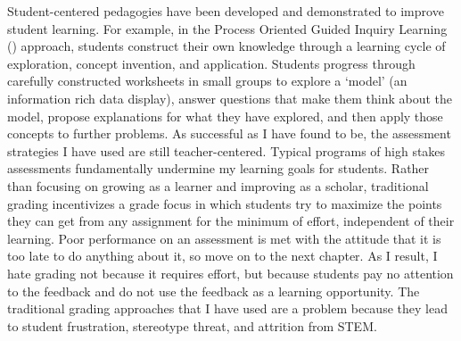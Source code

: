 \documentclass[10pt,letterpaper]{article}
\begin{document}

Student-centered pedagogies have been developed and demonstrated to improve student learning. 
For example, in the Process Oriented Guided Inquiry Learning (\pogil) approach, students construct their own knowledge
through a learning cycle of exploration, concept invention, and application.
Students progress through carefully constructed worksheets in small groups to explore a `model' (an information rich data display), answer questions that make them think about the model, propose explanations for what they have explored, and then apply those concepts to further problems.
% 
As successful as I have found \pogil to be, the assessment strategies I have used are still teacher-centered. Typical programs of high stakes assessments fundamentally undermine my learning goals for students. Rather than focusing on growing as a learner and improving as a scholar, traditional grading incentivizes a grade focus in which students try to maximize the points they can get from any assignment for the minimum of effort, independent of their learning. Poor performance on an assessment is met with the attitude that it is too late to do anything about it, so move on to the next chapter. As I result, I hate grading not because it requires effort, but because students pay no attention to the feedback and do not use the feedback as a learning opportunity. 
The traditional grading approaches that I have used are a problem because they lead to student frustration, stereotype threat, and attrition from STEM. 
\end{document}
